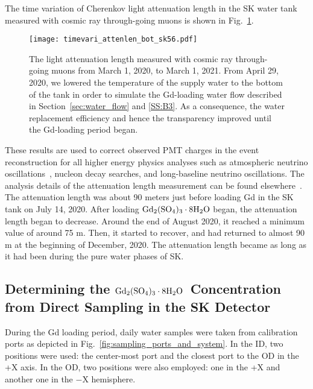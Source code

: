 \documentclass[preprint,12pt]{elsarticle}
\newcommand{\GdSOw}{$\rm Gd_2(\rm SO_4)_3\cdot \rm 8H_2O$\ }
\begin{document}
The time variation of Cherenkov light attenuation length in the SK water tank measured with cosmic ray through-going muons is shown in Fig.~\ref{fig:trans}. 
\begin{figure}[htb]
\centering\texttt{[image: timevari\_attenlen\_bot\_sk56.pdf]}
\caption{The light attenuation length measured with cosmic ray through-going muons from March 1, 2020, to March 1, 2021. From April 29, 2020, we lowered the temperature of the supply water to the bottom of the tank in order to simulate the Gd-loading water flow described in Section~\ref{sec:water_flow} and \ref{SS:B3}. As a consequence, the water replacement efficiency and hence the transparency improved until the Gd-loading period began.}
\label{fig:trans}
\end{figure}
These results are used to correct observed PMT charges in the event reconstruction for all higher energy physics analyses such as atmospheric neutrino oscillations~\cite{Abe:2018atm}, nucleon decay searches, and long-baseline neutrino oscillations. The analysis details of the attenuation length measurement can be found elsewhere~\cite{Fukuda:2003skdet}. The attenuation length was about 90 meters just before loading Gd in the SK tank on July 14, 2020. After loading $\rm Gd_2(SO_4)_3\cdot 8H_2O$ began, the attenuation length began to decrease. Around the end of August 2020, it reached a minimum value of around 75 m. Then, it started to recover, and had returned to almost 90 m at the beginning of December, 2020.
The attenuation length became as long as it had been during the pure water phases of SK.



\subsection{Determining the \GdSOw Concentration from Direct Sampling in the SK Detector}

During the Gd loading period, daily water samples were taken from calibration ports as depicted in  Fig.~\ref{fig:sampling_ports_and_system}. In the ID, two positions were used: the center-most port and the closest port to the OD in the +X axis. In the OD, two positions were also employed: one in the +X and another one in the $-$X hemisphere. %
\end{document}
